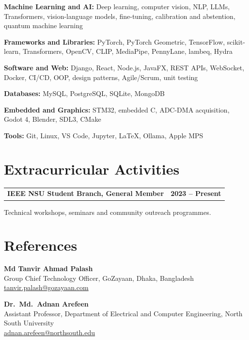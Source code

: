 \documentclass[10pt,letterpaper]{article}
\makeatletter
\newcommand{\entryhead}[2]{\par\needspace{4\baselineskip}\vspace{4pt}\noindent%
  \begin{tabular*}{\textwidth}[t]{@{}>{\raggedright\arraybackslash}p{0.72\textwidth}@{\extracolsep{\fill}}r@{}}
    \textbf{#1} & #2
  \end{tabular*}\par\vspace{1pt}}
\newcommand{\entry}[2]{\entryhead{#1}{\textbf{#2}}}
\let\origsection\section
\renewcommand{\section}[1]{\needspace{7\baselineskip}\origsection{#1}}
\makeatother
\begin{document}
\textbf{Machine Learning and AI:} Deep learning, computer vision, NLP, LLMs, Transformers,
vision-language models, fine-tuning, calibration and abstention, quantum machine learning

\textbf{Frameworks and Libraries:} PyTorch, PyTorch Geometric, TensorFlow, scikit-learn,
Transformers, OpenCV, CLIP, MediaPipe, PennyLane, lambeq, Hydra

\textbf{Software and Web:} Django, React, Node.js, JavaFX, REST APIs, WebSocket, Docker, CI/CD,
OOP, design patterns, Agile/Scrum, unit testing

\textbf{Databases:} MySQL, PostgreSQL, SQLite, MongoDB

\textbf{Embedded and Graphics:} STM32, embedded C, ADC-DMA acquisition, Godot 4, Blender, SDL3,
CMake

\textbf{Tools:} Git, Linux, VS Code, Jupyter, LaTeX, Ollama, Apple MPS

\section{Extracurricular Activities}
\entry{IEEE NSU Student Branch, General Member}{2023 -- Present}
Technical workshops, seminars and community outreach programmes.

\section{References}
\begingroup\raggedright
\noindent\textbf{Md Tanvir Ahmad Palash}\\
Group Chief Technology Officer, GoZayaan, Dhaka, Bangladesh\\
\href{mailto:tanvir.palash@gozayaan.com}{tanvir.palash@gozayaan.com}

\noindent\textbf{Dr.\ Md.\ Adnan Arefeen}\\
Assistant Professor, Department of Electrical and Computer Engineering, North South University\\
\href{mailto:adnan.arefeen@northsouth.edu}{adnan.arefeen@northsouth.edu}
\par\endgroup
\end{document}
